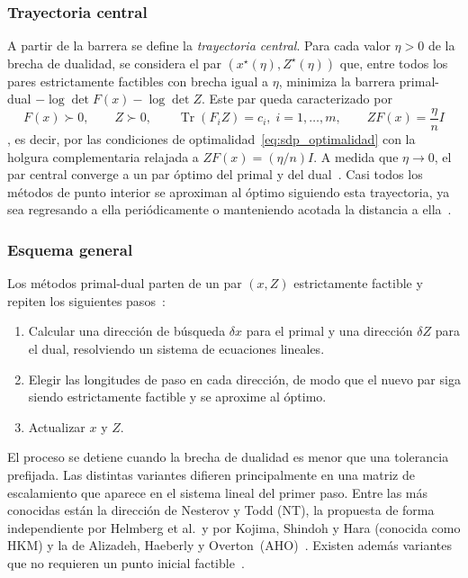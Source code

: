 \subsubsection*{Trayectoria central}

A partir de la barrera se define la \textit{trayectoria central}. Para cada valor $\eta > 0$ de la
brecha de dualidad, se considera el par $(x^\star(\eta), Z^\star(\eta))$ que, entre todos los
pares estrictamente factibles con brecha igual a $\eta$, minimiza la barrera primal-dual
$-\log\det F(x) - \log\det Z$. Este par queda caracterizado por
\begin{equation}
    \label{eq:sdp_trayectoria_central}
    F(x) \succ 0, \qquad
    Z \succ 0, \qquad
    \operatorname{Tr}(F_i Z) = c_i,\; i = 1, \ldots, m, \qquad
    Z F(x) = \frac{\eta}{n} I
\end{equation}
\parencite[p.~75]{vandenbergheSemidefiniteProgramming1996}, es decir, por las condiciones de
optimalidad~\eqref{eq:sdp_optimalidad} con la holgura complementaria relajada a
$Z F(x) = (\eta/n) I$. A medida que $\eta \to 0$, el par central converge a un par
óptimo del primal y del dual~\parencite[p.~75]{vandenbergheSemidefiniteProgramming1996}. Casi
todos los métodos de punto interior se aproximan al óptimo siguiendo esta trayectoria, ya sea
regresando a ella periódicamente o manteniendo acotada la distancia a
ella~\parencite[p.~74]{vandenbergheSemidefiniteProgramming1996}.

\subsubsection*{Esquema general}

Los métodos primal-dual parten de un par $(x, Z)$ estrictamente factible y repiten los siguientes
pasos~\parencite[p.~77]{vandenbergheSemidefiniteProgramming1996}:
\begin{enumerate}
    \item Calcular una dirección de búsqueda $\delta x$ para el primal y una dirección
    $\delta Z$ para el dual, resolviendo un sistema de ecuaciones lineales.
    \item Elegir las longitudes de paso en cada dirección, de modo que el nuevo par siga siendo
    estrictamente factible y se aproxime al óptimo.
    \item Actualizar $x$ y $Z$.
\end{enumerate}
El proceso se detiene cuando la brecha de dualidad es menor que una tolerancia prefijada. Las
distintas variantes difieren principalmente en una matriz de escalamiento que aparece en el
sistema lineal del primer paso. Entre las más conocidas están la dirección de Nesterov y Todd
(NT), la propuesta de forma independiente por Helmberg et al.\ y por Kojima, Shindoh y Hara
(conocida como HKM) y la de Alizadeh, Haeberly y
Overton~(AHO)~\parencite[pp.~80--81]{vandenbergheSemidefiniteProgramming1996}. Existen
además variantes que no requieren un punto inicial
factible~\parencite[p.~88]{vandenbergheSemidefiniteProgramming1996}.

